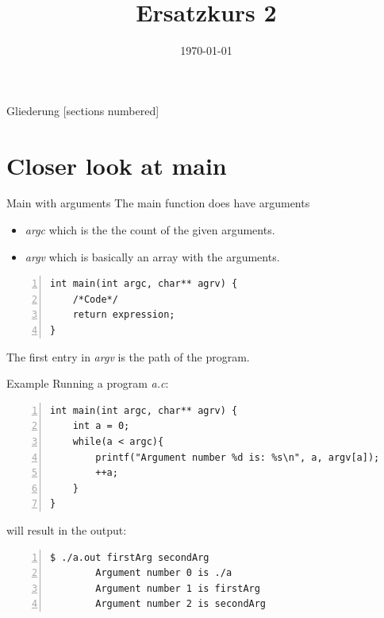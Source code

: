 



\title{Ersatzkurs 2}
\date{\today}




\maketitle

\begin{frame}{Gliederung}
	[sections numbered]
	\tableofcontents
\end{frame}

\section{Closer look at main}

\begin{frame}[fragile]{Main with arguments}
    The main function does have arguments
    \begin{itemize}
     \item \textit{argc} which is the the count of the given arguments.
     \item \textit{argv} which is basically an array with the arguments.
    \end{itemize}

    \begin{lstlisting}[numbers=left]
int main(int argc, char** agrv) {
	/*Code*/
	return expression;
}    \end{lstlisting}

    The first entry in \textit{argv} is the path of the program. 
\end{frame}


\begin{frame}[fragile]{Example}
    Running a program \textit{a.c}:
    \begin{lstlisting}[numbers=left]
int main(int argc, char** agrv) {
	int a = 0;
	while(a < argc){
        printf("Argument number %d is: %s\n", a, argv[a]);
        ++a; 
	}
}    \end{lstlisting}
    will result in the output:    
    \begin{lstlisting}[numbers=left]
    $ ./a.out firstArg secondArg
        Argument number 0 is ./a
        Argument number 1 is firstArg
        Argument number 2 is secondArg  \end{lstlisting}
\end{frame}

